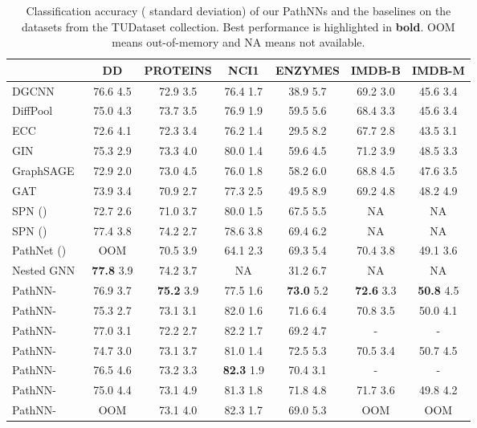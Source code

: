 \documentclass{article}
\theoremstyle{plain}
\theoremstyle{definition}
\theoremstyle{remark}
\begin{document}
\begin{table*}[t]
\centering
\caption{Classification accuracy ( standard deviation) of our PathNNs and the baselines on the datasets from the TUDataset collection. Best performance is highlighted in \textbf{bold}. OOM means out-of-memory and NA means not available.}
\label{tab:results_tudatasets}
\scriptsize
\renewcommand{\arraystretch}{1.2}
\begin{tabular}{l|cccccc}
\toprule
& \textbf{DD} & \textbf{PROTEINS}  & \textbf{NCI1} & \textbf{ENZYMES} & \textbf{IMDB-B} & \textbf{IMDB-M} \\
\midrule
DGCNN~\cite{zhang2018end} & 76.6  4.5 & 72.9  3.5 &  76.4  1.7 &  38.9  5.7  & 69.2  3.0 & 45.6  3.4\\ 
DiffPool~\cite{ying2018hierarchical} & 75.0  4.3 & 73.7  3.5 &  76.9  1.9 & 59.5  5.6 & 68.4  3.3 & 45.6  3.4\\ 
ECC~\cite{simonovsky2017dynamic} & 72.6  4.1 & 72.3  3.4 &  76.2  1.4 &  29.5  8.2 & 67.7  2.8 & 43.5  3.1\\ 
GIN~\cite{xu2019powerful} & 75.3  2.9 & 73.3  4.0 & 80.0  1.4 &  59.6  4.5 & 71.2  3.9 & 48.5  3.3 \\ 
GraphSAGE~\cite{hamilton2017inductive} & 72.9  2.0 & 73.0  4.5 &  76.0  1.8  & 58.2  6.0 & 68.8  4.5 & 47.6  3.5 \\
GAT~\cite{velivckovic2018graph} & 73.9  3.4 & 70.9  2.7 & 77.3  2.5 & 49.5  8.9 & 69.2  4.8 & 48.2  4.9 \\
SPN ()~\cite{abboud2022shortest} & 72.7  2.6 & 71.0  3.7 & 80.0  1.5 & 67.5  5.5 & NA & NA \\ 
SPN ()~\cite{abboud2022shortest} & 77.4  3.8 & 74.2  2.7 & 78.6  3.8 & 69.4  6.2 & NA & NA \\ 
PathNet ()~\cite{sun2022beyond} & OOM & 70.5  3.9 & 64.1  2.3 & 69.3  5.4 & 70.4  3.8 & 49.1  3.6   \\
Nested GNN~\cite{zhang2021nested} & \textbf{77.8}  3.9 & 74.2  3.7 & NA & 31.2  6.7 & NA & NA \\ 
\midrule
PathNN-  & 76.9  3.7 & \textbf{75.2}  3.9 & 77.5  1.6 & \textbf{73.0}  5.2 & 
\textbf{72.6}  3.3 & \textbf{50.8}  4.5 \\
PathNN-  & 75.3  2.7 & 73.1  3.1 & 82.0  1.6 & 71.6  6.4 &
70.8  3.5 & 50.0  4.1 \\
PathNN-  & 77.0  3.1 & 72.2  2.7 & 82.2  1.7 & 69.2  4.7 & 
- & -\\
PathNN-  & 74.7  3.0 & 73.1  3.7 & 81.0  1.4 & 72.5  5.3 &
70.5  3.4 & 50.7  4.5 \\
PathNN-  & 76.5  4.6 & 73.2  3.3 &  \textbf{82.3}  1.9 & 70.4  3.1  &
- & -\\
PathNN-  & 75.0  4.4 & 73.1  4.9 & 81.3  1.8 & 71.8  4.8 &
71.7  3.6 & 49.8  4.2 \\
PathNN-  & OOM & 73.1  4.0& 82.3  1.7 & 69.0  5.3 &
OOM & OOM \\
\bottomrule
\end{tabular}
\end{table*}
\end{document}
